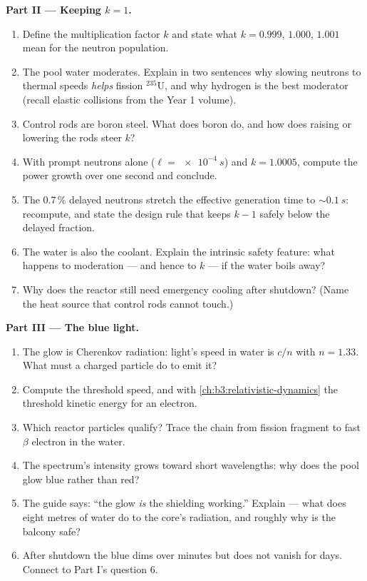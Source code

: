 \begin{problem}
\medskip\noindent\textbf{Part II --- Keeping $k = 1$.}

\begin{enumerate}[resume]
  \item Define the multiplication factor $k$ and state what
        $k = 0.999$, $1.000$, $1.001$ mean for the neutron
        population.
  \item The pool water moderates. Explain in two sentences why
        slowing neutrons to thermal speeds \emph{helps} fission
        $^{235}$U, and why hydrogen is the best moderator
        (recall elastic collisions from the Year 1 volume).
  \item Control rods are boron steel. What does boron do, and
        how does raising or lowering the rods steer $k$?
  \item With prompt neutrons alone ($\ell = \qty{e-4}{s}$) and
        $k = 1.0005$, compute the power growth over one second
        and conclude.
  \item The 0.7\,\% delayed neutrons stretch the effective
        generation time to $\sim\qty{0.1}{s}$: recompute, and
        state the design rule that keeps $k - 1$ safely below
        the delayed fraction.
  \item The water is also the coolant. Explain the intrinsic
        safety feature: what happens to moderation --- and hence
        to $k$ --- if the water boils away?
  \item Why does the reactor still need emergency cooling after
        shutdown? (Name the heat source that control rods cannot
        touch.)
\end{enumerate}

\medskip\noindent\textbf{Part III --- The blue light.}

\begin{enumerate}[resume]
  \item The glow is Cherenkov radiation: light's speed in water
        is $c/n$ with $n = 1.33$. What must a charged particle do
        to emit it?
  \item Compute the threshold speed, and with
        \cref{ch:b3:relativistic-dynamics} the threshold kinetic
        energy for an electron.
  \item Which reactor particles qualify? Trace the chain from
        fission fragment to fast $\beta$ electron in the water.
  \item The spectrum's intensity grows toward short wavelengths:
        why does the pool glow blue rather than red?
  \item The guide says: ``the glow \emph{is} the shielding
        working.'' Explain --- what does eight metres of water do
        to the core's radiation, and roughly why is the balcony
        safe?
  \item After shutdown the blue dims over minutes but does not
        vanish for days. Connect to Part I's question 6.
\end{enumerate}


\end{problem}
